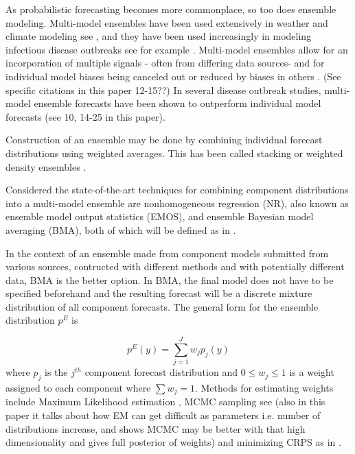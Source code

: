\documentclass{article}\usepackage[]{graphicx}\usepackage[]{color}
\begin{document}
As probabilistic forecasting becomes more commonplace, so too does ensemble 
modeling. Multi-model ensembles have been used extensively in weather and
climate modeling see \cite{baran2018combining}, 
and they have been used increasingly in modeling infectious disease outbreaks
see for example \cite{yamana2016superensemble}. 
Multi-model ensembles allow for an incorporation of multiple signals -
often from differing data sources- and for individual model biases being canceled
out or reduced by biases in others \cite{reich2019accuracy}. (See specific citations in this paper 12-15??)
In several disease outbreak studies, multi-model ensemble forecasts have been 
shown to outperform individual model forecasts \cite{cramer2021evaluation} (see
10, 14-25 in this paper).

Construction of an ensemble may be done by combining individual forecast 
distributions using weighted averages. This has been called stacking 
\cite{wolpert1992stacked} or weighted density ensembles 
\cite{ray2018prediction}.

Considered the state-of-the-art techniques for combining component distributions
into a multi-model ensemble are nonhomogeneous regression (NR), also known as
ensemble model output statistics (EMOS), and ensemble Bayesian model averaging
(BMA), both of which will be defined as in \cite{gneiting2014probabilistic}.

In the context of an ensemble made from component models submitted from various
sources, contructed with different methods and with potentially different data,
BMA is the better option. In BMA, the final model does not have to be specified
beforehand and the resulting forecast will be a discrete mixture distribution
of all component forecasts. The general form for the ensemble distribution $p^E$
is

\begin{equation}
  p^E(y) = \sum_{j=1}^J w_jp_j(y)
\end{equation}
where $p_j$ is the $j^{th}$ component forecast distribution and 
$0 \leq w_j \leq 1$ is a weight assigned to each component where $\sum w_j = 1$.
Methods for estimating weights include Maximum Likelihood estimation
\cite{raftery2005using}, MCMC 
sampling see \cite{vrugt2008ensemble} (also in this paper it talks about how 
EM can get difficult as parameters i.e. number of distributions increase, and 
shows MCMC may be better with that high dimensionality and gives full posterior
of weights)
and minimizing CRPS as in 
\cite{baran2018combining}.
\end{document}
